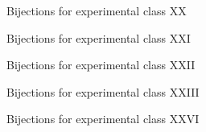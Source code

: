 \begin{figure}[ht!]
    \centering
    
    \caption{Bijections for experimental class XX}
    \label{fig:expgrp_XX}
\end{figure}


\begin{figure}[ht!]
    \centering
    
    \caption{Bijections for experimental class XXI}
    \label{fig:expgrp_XXI}
\end{figure}


\begin{figure}[ht!]
    \centering
    
    \caption{Bijections for experimental class XXII}
    \label{fig:expgrp_XXII}
\end{figure}


\begin{figure}[ht!]
    \centering
    
    \caption{Bijections for experimental class XXIII}
    \label{fig:expgrp_XXIII}
\end{figure}


\begin{comment}
\begin{figure}[ht!]
    \centering
    
    \caption{Bijections for experimental class XXIV}
    \label{fig:expgrp_XXIV}
\end{figure}
\end{comment}


\begin{comment}
\begin{figure}[ht!]
    \centering
    
    \caption{Bijections for experimental class XXV}
    \label{fig:expgrp_XXV}
\end{figure}
\end{comment}


\begin{figure}[ht!]
    \centering
    
    \caption{Bijections for experimental class XXVI}
    \label{fig:expgrp_XXVI}
\end{figure}

